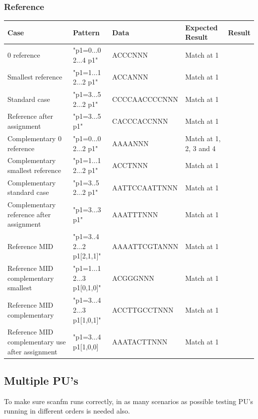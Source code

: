 \documentclass[12pt]{article}
\newcommand{\textapprox}{\raisebox{0.5ex}{\texttildelow}}
\newcommand{\pus}{PU's }
\begin{document}
\subsubsection{Reference}
\begin{table}[h]
\begin{tabular}{p{4cm}|l|l|p{3cm}|l}
Case 			& Pattern & Data & Expected Result & Result \\ \hline
0 reference 	& "p1=0...0 2...4 p1" & ACCCNNN & Match at 1 & \\ \hline
Smallest reference 	& "p1=1...1 2...2 p1" & ACCANNN & Match at 1 & \\ \hline
Standard case	& "p1=3...5 2...2 p1" & CCCCAACCCCNNN & Match at 1 & \\ \hline
Reference after assignment & "p1=3...5 p1" & CACCCACCNNN & Match at 1 & \\ \hline
Complementary 0 reference & "p1=0...0 2...2 \textapprox p1" & AAAANNN & Match at 1, 2, 3 and 4 & \\ \hline
Complementary smallest reference & "p1=1...1 2...2 \textapprox p1" & ACCTNNN & Match at 1 & \\ \hline
Complementary standard case & "p1=3..5 2...2 \textapprox p1" & AATTCCAATTNNN & Match at 1 & \\ \hline
Complementary reference after assignment & "p1=3...3 \textapprox p1" & AAATTTNNN & Match at 1 & \\ \hline
Reference MID & "p1=3..4 2...2 p1[2,1,1]" & AAAATTCGTANNN & Match at 1 & \\ \hline
Reference MID complementary smallest & "p1=1...1 2...3 \textapprox p1[0,1,0]" & ACGGGNNN & Match at 1 & \\ \hline
Reference MID complementary & "p1=3...4 2...3 \textapprox p1[1,0,1]" & ACCTTGCCTNNN & Match at 1 & \\ \hline 
Reference MID complementary use after assignment & "p1=3...4 \textapprox p1[1,0,0] & AAATACTTNNN & Match at 1
\end{tabular}
\end{table}


\subsection{Multiple \pus}
To make sure scanfm runs correctly, in as many scenarios as possible testing \pus running
in different orders is needed also.
\end{document}

